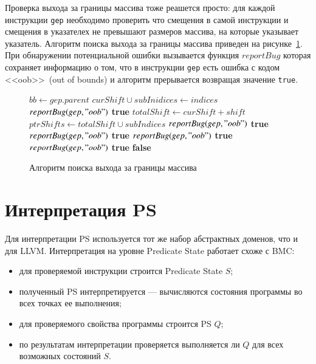 Проверка выхода за границы массива тоже реашется просто: для каждой инструкции
\texttt{gep} необходимо проверить что смещения в самой инструкции и смещения в 
указателех не превышают размеров массива, на которые указывает указатель. 
Алгоритм поиска выхода за границы массива приведен на 
рисунке~\ref{image:oobChecker}. При обнаружении потенциальной ошибки вызывается
функция $reportBug$ которая сохраняет информацию о том, что в инструкции 
\texttt{gep} есть ошибка с кодом <<oob>>~(out of bounds) и алгоритм 
прерывается возвращая значение \texttt{true}.
\begin{figure}[h!]
\begin{algorithmic}[1]
\State $bb \gets gep.parent$
\State $curShift \cup subInidices \gets indices$
    \State $reportBug(gep, "oob")$
    \State \Return \textbf{true}
            \State $totalShift \gets curShift + shift$
            \State $ptrShifts \gets totalShift \cup subIndices$
                \State $reportBug(gep, "oob")$
                \State \Return \textbf{true}
            \EndIf
        \EndFor
    \EndFor
{}
        \State $reportBug(gep, "oob")$
        \State \Return \textbf{true}
    \EndIf
        \State $reportBug(gep, "oob")$
        \State \Return \textbf{true}
    \EndIf
            \State $reportBug(gep, "oob")$
            \State \Return \textbf{true}
        \EndIf
    \EndFor
\EndIf
\State \Return \textbf{false}    
\EndFunction
\end{algorithmic}
\caption{Алгоритм поиска выхода за границы массива}
\label{image:oobChecker}
\end{figure}

\section{Интерпретация PS}
Для интерпретации PS используется тот же набор абстрактных доменов, что и для 
LLVM. Интерпретация на уровне Predicate State работает схоже с BMC:
\begin{itemize}
\item для проверяемой инструкции строится Predicate State $S$;
\item полученный PS интерпретируется --- вычисляются состояния программы
во всех точках ее выполнения;
\item для проверяемого свойства программы строится PS $Q$;
\item по результатам интерпретации проверяется выполняется ли $Q$ для всех 
возможных состояний $S$.
\end{itemize}

